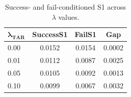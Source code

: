 \begin{table}[t]
\centering
\caption{Success- and fail-conditioned S1 across $\lambda$ values.}
\label{tab:success_fail_s1}
\begin{tabular}{lccc}
\toprule
$\boldsymbol{\lambda_{\text{TAR}}}$ & \textbf{SuccessS1} & \textbf{FailS1} & \textbf{Gap} \\
\midrule
0.00 & 0.0152 & 0.0154 & 0.0002 \\
0.01 & 0.0112 & 0.0087 & 0.0025 \\
0.05 & 0.0105 & 0.0092 & 0.0013 \\
0.10 & 0.0099 & 0.0067 & 0.0032 \\
\bottomrule
\end{tabular}
\end{table}
